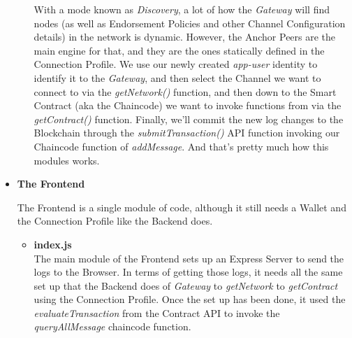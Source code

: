 \begin{itemize}
\begin{itemize}
							\hspace{10mm}With a mode known as \textit{Discovery}, a lot of how the \textit{Gateway} will find nodes (as well as Endorsement Policies and other Channel Configuration details) in the network is dynamic. However, the Anchor Peers are the main engine for that, and they are the ones statically defined in the Connection Profile. We use our newly created \textit{app-user} identity to identify it to the \textit{Gateway}, and then select the Channel we want to connect to via the \textit{getNetwork()} function, and then down to the Smart Contract (aka the Chaincode) we want to invoke functions from via the \textit{getContract()} function. Finally, we'll commit the new log changes to the Blockchain through the \textit{submitTransaction()} API function invoking our Chaincode function of \textit{addMessage}. And that's pretty much how this modules works.
						
					\end{itemize}
					
			\item \textbf{The Frontend}
				
					\hspace{10mm}The Frontend is a single module of code, although it still needs a Wallet and the Connection Profile like the Backend does.
					
					\begin{itemize}
					
						\item \textbf{index.js}\\
						
							\hspace{10mm}The main module of the Frontend sets up an Express Server to send the logs to the Browser. In terms of getting those logs, it needs all the same set up that the Backend does of \textit{Gateway} to \textit{getNetwork} to \textit{getContract} using the Connection Profile. Once the set up has been done, it used the \textit{evaluateTransaction} from the Contract API to invoke the \textit{queryAllMessage} chaincode function.
					
					\end{itemize}
					
			\end{itemize}
							
						